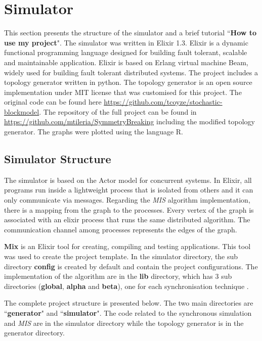 \section{Simulator}
\label{chap:4}

This section presents the structure of the simulator and a brief tutorial ``\textbf{How to use my project}". The simulator was written in Elixir 1.3. Elixir is a dynamic functional programming language designed for building fault tolerant, scalable and maintainable application. Elixir is based on Erlang virtual machine Beam, widely used for building fault tolerant distributed systems. The project includes a topology generator written in python. The topology generator is an open source implementation under MIT license that was customised for this project. The original code can be found here \url{https://github.com/tcoyze/stochastic-blockmodel}. The repository of the full project can be found in \url{https://github.com/mtileria/SymmetryBreaking} including the modified topology generator. The graphs were plotted using the language R.



\subsection{Simulator Structure}

The simulator is based on the Actor model for concurrent systems. In Elixir, all programs run inside a lightweight process that is isolated from others and it can only communicate via messages. Regarding the \textit{MIS} algorithm implementation, there is a mapping from the graph to the processes. Every vertex of the graph is associated with an elixir process that runs the same distributed algorithm. The communication channel among processes represents the edges of the graph.   

\textbf{Mix} is an Elixir tool for creating, compiling and testing applications. This tool was used to create the project template. In the simulator directory, the sub directory \textbf{config} is created by default and contain the project configurations.  The implementation of the algorithm are in the \textbf{lib} directory, which has 3 sub directories (\textbf{global}, \textbf{alpha} and \textbf{beta}), one for each synchronisation technique  .

The complete project structure is presented below. The two main directories are ``\textbf{generator}" and ``\textbf{simulator}". The code related to the synchronous simulation and \textit{MIS} are in the simulator directory while the topology generator is in the generator directory. 


